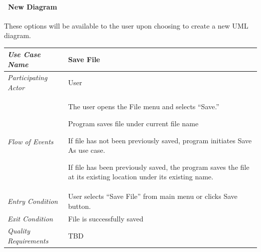 \documentclass[twoside,letterpaper]{article}
\newenvironment{my_enumerate}{
\begin{enumerate}
  \setlength{\itemsep}{1pt}
  \setlength{\parskip}{0pt}
  \setlength{\parsep}{0pt}}{\end{enumerate}
}
\begin{document}
\clearpage

\paragraph[\ Use Category]
{\ New Diagram} {These options will be available to the user upon choosing to create a new UML diagram.}

\begin{flushleft}
\tablehead{}
\begin{tabular}{|m{2.0in} m{5.0in}|}
\hline
{\bfseries\emph{Use Case Name}}
& {\bfseries Save File}
\\\hline
\emph{Participating Actor}
& User
\\\hline
\emph{Flow of Events}
& \begin{my_enumerate}
  \item The user opens the File menu and selects ``Save.''
  \item Program saves file under current file name 
\begin{my_enumerate}
\item If file has not been previously saved, program initiates Save As use case. 
\item If file has been previously saved, the program saves the file at its existing location under its existing name.
\end{my_enumerate}
\end{my_enumerate}
\\\hline
\emph{Entry Condition}
& User selects ``Save File'' from main menu or clicks Save button.
\\\hline
\emph{Exit Condition}
& File is successfully saved
\\\hline
\emph{Quality Requirements}
& TBD
\\\hline
\end{tabular}
\end{flushleft}
\bigskip
\end{document}
